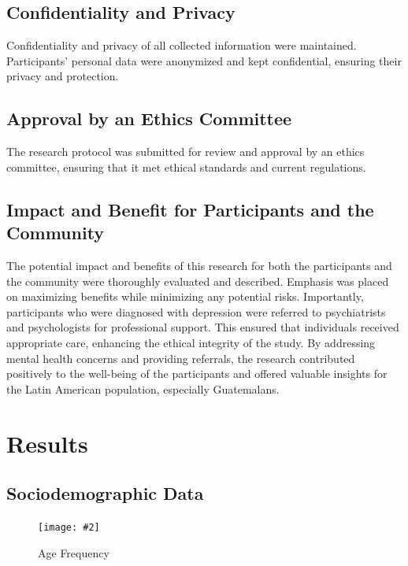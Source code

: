 \documentclass[jou]{apa7}
\newcommand{\includegraphicsmax}[2][]{%
	\texttt{[image: \#2]}%
}
\begin{document}
\subsection{Confidentiality and Privacy}\label{confidencialidad-y-privacidad}

Confidentiality and privacy of all collected information were maintained. Participants' personal data were anonymized and kept confidential, ensuring their privacy and protection.

\subsection{Approval by an Ethics Committee}\label{aprobaciuxf3n-de-un-comituxe9-de-uxe9tica}

The research protocol was submitted for review and approval by an ethics committee, ensuring that it met ethical standards and current regulations.

\subsection{Impact and Benefit for Participants and the Community}\label{impact-and-benefit-for-participants-and-community}

The potential impact and benefits of this research for both the participants and the community were thoroughly evaluated and described. Emphasis was placed on maximizing benefits while minimizing any potential risks. Importantly, participants who were diagnosed with depression were referred to psychiatrists and psychologists for professional support. This ensured that individuals received appropriate care, enhancing the ethical integrity of the study. By addressing mental health concerns and providing referrals, the research contributed positively to the well-being of the participants and offered valuable insights for the Latin American population, especially Guatemalans.

\section{Results}\label{resultados}

\subsection{Sociodemographic Data}

\begin{figure}[!ht]
	\centering
	\includegraphicsmax{freq.age.pdf}
	\caption{Age Frequency}
	\label{fig:Figure1}
\end{figure}
\end{document}
